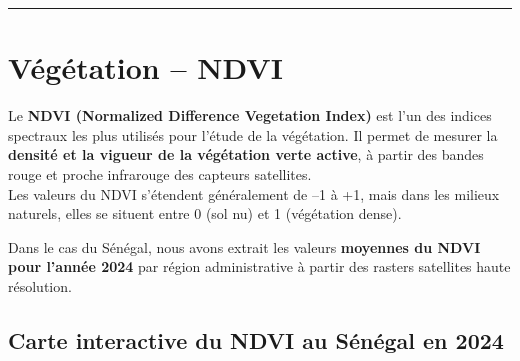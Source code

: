 \documentclass[
]{book}
\begin{document}
\begin{center}\rule{0.5\linewidth}{0.5pt}\end{center}

\section{Végétation -- NDVI}\label{vuxe9guxe9tation-ndvi}

Le \textbf{NDVI (Normalized Difference Vegetation Index)} est l'un des indices spectraux les plus utilisés pour l'étude de la végétation. Il permet de mesurer la \textbf{densité et la vigueur de la végétation verte active}, à partir des bandes rouge et proche infrarouge des capteurs satellites.\\
Les valeurs du NDVI s'étendent généralement de --1 à +1, mais dans les milieux naturels, elles se situent entre 0 (sol nu) et 1 (végétation dense).

Dans le cas du Sénégal, nous avons extrait les valeurs \textbf{moyennes du NDVI pour l'année 2024} par région administrative à partir des rasters satellites haute résolution.

\subsection{Carte interactive du NDVI au Sénégal en 2024}\label{carte-interactive-du-ndvi-au-suxe9nuxe9gal-en-2024}
\end{document}
